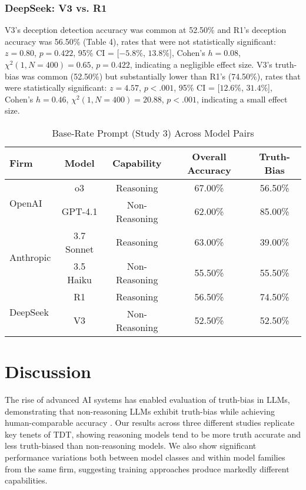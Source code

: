 \documentclass{article}
\begin{document}
\subsubsection{DeepSeek: V3 vs. R1}

V3's deception detection accuracy was common at 52.50\% and R1's deception accuracy was 56.50\% (Table 4), rates that were not statistically significant:  $z = 0.80$, $p = 0.422$, 95\% CI = [$-5.8\%$, $13.8\%$], Cohen’s $h =0.08$, $\chi^2(1, N = 400) = 0.65$, $p = 0.422$, indicating a negligible effect size. V3's truth-bias was common (52.50\%) but substantially lower than R1's (74.50\%), rates that were statistically significant: $z = 4.57$, $p < .001$, 95\% CI = [$12.6\%$, $31.4\%$], Cohen’s $h = 0.46$, $\chi^2(1, N = 400) = 20.88$, $p < .001$, indicating a small effect size.

\begin{table}[ht]
\centering
\caption{Base-Rate Prompt (Study 3) Across Model Pairs}
\begin{tabular}{lcccc}
\toprule
\textbf{Firm} & \textbf{Model} & \textbf{Capability} & \textbf{Overall Accuracy} & \textbf{Truth-Bias} \\
\midrule
\multirow{2}{*}{OpenAI} & o3 & Reasoning & 67.00\% & 56.50\%   \\
& GPT-4.1 & Non-Reasoning & 62.00\% & 85.00\% \\
\midrule
\multirow{2}{*}{Anthropic} & 3.7 Sonnet & Reasoning & 63.00\% & 39.00\% \\
& 3.5 Haiku & Non-Reasoning & 55.50\% & 55.50\% \\
\midrule
\multirow{2}{*}{DeepSeek} & R1 & Reasoning & 56.50\% & 74.50\% \\
& V3 & Non-Reasoning & 52.50\% & 52.50\% \\
\bottomrule
\end{tabular}
\label{tab:study3_model_comparison}
\end{table}

\section{Discussion}
\label{sec:discussion}

The rise of advanced AI systems has enabled evaluation of truth-bias in LLMs, demonstrating that non-reasoning LLMs exhibit truth-bias while achieving human-comparable accuracy  \citep{markowitz_generative_2024}. Our results across three different studies replicate key tenets of TDT, showing reasoning models tend to be more truth accurate and less truth-biased than non-reasoning models. We also show significant performance variations both between model classes and within model families from the same firm, suggesting training approaches produce markedly different capabilities.
\end{document}
